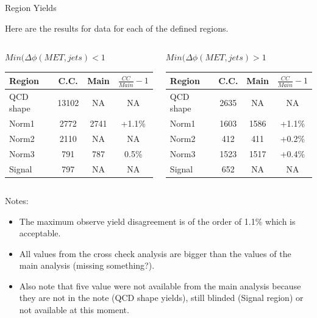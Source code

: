 \documentclass[8pt]{beamer}
\begin{document}
\begin{frame}{Region Yields}

\begin{center}
Here are the results for data for each of the defined regions.
\end{center}


\begin{columns}

\begin{block}{$Min(\Delta\phi(MET,jets)<1$}
\centering

\begin{tabular}{|l|c|c|c|}
\hline
Region & C.C. & Main & $\frac{CC}{Main}-1$ \\
\hline \hline
QCD shape & 13102 &   NA & NA \\
Norm1     &  2772 & 2741 & +1.1\% \\
Norm2     &  2110 &   NA & NA \\
Norm3     &   791 &  787 & 0.5\% \\
Signal    &   797 &   NA & NA \\
\hline
\end{tabular}

\end{block}

\begin{block}{$Min(\Delta\phi(MET,jets)>1$}
\centering

\begin{tabular}{|l|c|c|c|}
\hline
Region & C.C. & Main & $\frac{CC}{Main}-1$ \\
\hline \hline
QCD shape & 2635 &   NA & NA \\
Norm1     & 1603 & 1586 & +1.1\% \\
Norm2     &  412 &  411 & +0.2\% \\
Norm3     & 1523 & 1517 & +0.4\% \\
Signal    &  652 &   NA & NA \\
\hline
\end{tabular}

\end{block}

\end{columns}

\begin{block}{Notes:}
 
\begin{itemize}
 \item The maximum observe yield disagreement is of the order of 1.1\% which is acceptable.
 \item All values from the cross check analysis are bigger than the values of the main analysis (missing something?).
 \item Also note that five value were not available from the main analysis because they are not in the note (QCD shape yields), still blinded (Signal region) or not available at this moment.
\end{itemize}

\end{block}

\end{frame}
\end{document}
